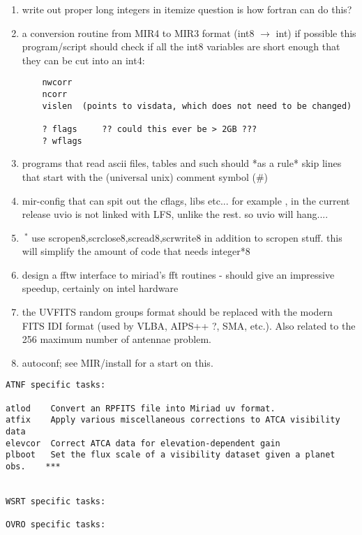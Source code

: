 \begin{enumerate}
\item
write out proper long integers in itemize
question is how fortran can do this?

\item
a conversion routine from MIR4 to MIR3 format (int8 $\rightarrow$ int) if possible
this program/script should check if all the int8 variables are short
enough that they can be cut into an int4:

\begin{verbatim}
	nwcorr
	ncorr
	vislen	(points to visdata, which does not need to be changed)
	
	? flags		?? could this ever be > 2GB ???
	? wflags
\end{verbatim}

\item
programs that read ascii files, tables and such should *as a rule*
skip lines that start with the (universal unix) comment symbol (\#)

\item
mir-config that can spit out the cflags, libs etc...
for example , in the current release uvio  is not linked with LFS,
unlike the rest. so uvio will hang....

\item
$\ ^{*}$
use scropen8,scrclose8,scread8,scrwrite8 in addition to scropen stuff.
this will simplify the amount of code that needs integer*8



\item
design a fftw interface to miriad's fft routines - should give an impressive
speedup, certainly on intel hardware

\item
the UVFITS random groups format should be replaced with the modern
FITS IDI format (used by VLBA, AIPS++ ?, SMA, etc.). Also related
to the 256 maximum number of antennae problem.

\item
autoconf; see MIR/install for a start on this.

\end{enumerate}

\begin{verbatim}
ATNF specific tasks:

atlod    Convert an RPFITS file into Miriad uv format.
atfix    Apply various miscellaneous corrections to ATCA visibility data  
elevcor  Correct ATCA data for elevation-dependent gain
plboot   Set the flux scale of a visibility dataset given a planet obs.    ***


WSRT specific tasks:

OVRO specific tasks:
\end{verbatim}

